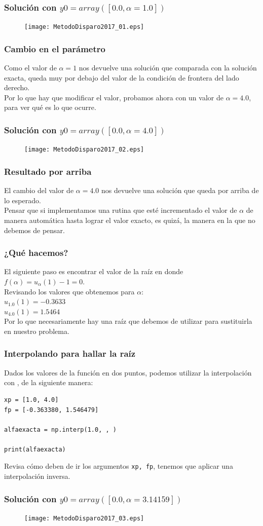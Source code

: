 \begin{frame}[fragile]
\frametitle{Solución con $y0 = array([0.0,\alpha=1.0])$}
\begin{figure}
    \centering
    \texttt{[image: MetodoDisparo2017\_01.eps]}
\end{figure}
\end{frame}
\begin{frame}
\frametitle{Cambio en el parámetro}
Como el valor de $\alpha = 1$ nos devuelve una solución que comparada con la solución exacta, queda muy por debajo del valor de la condición de frontera del lado derecho.
\\
\bigskip
Por lo que hay que modificar el valor, probamos ahora con un valor de $\alpha = 4.0$, para ver qué es lo que ocurre.
\end{frame}
\begin{frame}[fragile]
\frametitle{Solución con $y0 = array([0.0,\alpha=4.0])$}
\begin{figure}
    \centering
    \texttt{[image: MetodoDisparo2017\_02.eps]}
\end{figure}
\end{frame}
\begin{frame}
\frametitle{Resultado por arriba}
El cambio del valor de $\alpha = 4.0$ nos devuelve una solución que queda por arriba de lo esperado.
\\
\bigskip
Pensar que si implementamos una rutina que esté incrementado el valor de $\alpha$ de manera automática hasta lograr el valor exacto, es quizá, la manera en la que no debemos de pensar.
\end{frame}
\begin{frame}
\frametitle{¿Qué hacemos?}
El siguiente paso es encontrar el valor de la raíz en donde $f(\alpha) = u_{\alpha}(1) - 1 = 0$.
\\
\medskip
Revisando los valores que obtenemos para $\alpha$:
\\
\medskip
$u_{1.0}(1) = -0.3633$ \\
$u_{4.0}(1) = 1.5464$
\\
\medskip
Por lo que necesariamente hay una raíz que debemos de utilizar para sustituirla en nuestro problema.
\end{frame}
\begin{frame}[fragile]
\frametitle{Interpolando para hallar la raíz}
Dados los valores de la función en dos puntos, podemos utilizar la interpolación con \python, de la siguiente manera:
\begin{lstlisting}[caption=Código para la interpolación, style=FormattedNumber, basicstyle=\linespread{1.1}\ttfamily=\small, columns=fullflexible]
xp = [1.0, 4.0]
fp = [-0.363380, 1.546479]

alfaexacta = np.interp(1.0, , )

print(alfaexacta)
\end{lstlisting}
Revisa cómo deben de ir los argumentos \texttt{xp, fp}, tenemos que aplicar una interpolación inversa.
\end{frame}
\begin{frame}[fragile]
\frametitle{Solución con $y0 = array([0.0,\alpha=3.14159])$}
\begin{figure}
    \centering
    \texttt{[image: MetodoDisparo2017\_03.eps]}
\end{figure}
\end{frame}
